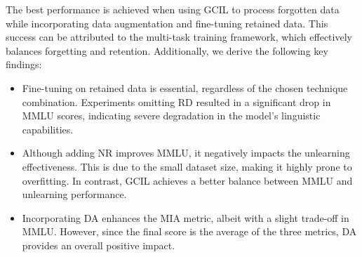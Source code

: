 \documentclass[11pt]{article}
\begin{document}




The best performance is achieved when using GCIL to process forgotten data while incorporating data augmentation and fine-tuning retained data. This success can be attributed to the multi-task training framework, which effectively balances forgetting and retention. Additionally, we derive the following key findings:
\begin{itemize}
	\item Fine-tuning on retained data is essential, regardless of the chosen technique combination. Experiments omitting RD resulted in a significant drop in MMLU scores, indicating severe degradation in the model’s linguistic capabilities.
	\item Although adding NR improves MMLU, it negatively impacts the unlearning effectiveness. This is due to the small dataset size, making it highly prone to overfitting. In contrast, GCIL achieves a better balance between MMLU and unlearning performance.
	\item Incorporating DA enhances the MIA metric, albeit with a slight trade-off in MMLU. However, since the final score is the average of the three metrics, DA provides an overall positive impact.
\end{itemize}
\end{document}
